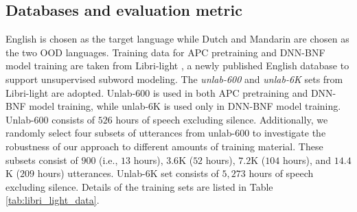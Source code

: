 \documentclass[a4paper]{article}
\begin{document}
\subsection{Databases and evaluation metric}
 English is chosen as the target language while Dutch and Mandarin are chosen as the two OOD languages. %
Training data for APC pretraining and DNN-BNF model training are taken from  Libri-light \cite{kahn2019librilight}, 
a newly published English database
to support unsupervised subword modeling. 
The \textit{unlab-600} and  \textit{unlab-6K} sets from Libri-light are adopted. Unlab-600 is used in both APC pretraining and DNN-BNF model training, while unlab-6K is used only in DNN-BNF model training.
Unlab-600   consists of 
$526$ hours of speech excluding silence.
Additionally, we randomly select four subsets of utterances from unlab-600 to investigate the robustness of our approach to different amounts of training material. These subsets consist of $900$ (i.e., $13$ hours), $3.6$K ($52$ hours), $7.2$K ($104$ hours), and $14.4$K ($209$ hours)   utterances. 
Unlab-6K  set consists of $5,273$ hours of
speech excluding silence.  Details of the training sets are listed in Table \ref{tab:libri_light_data}.
\begin{table}[!t]
\renewcommand\arraystretch{0.7}
\centering
\caption{Libri-light training data and its subsets.}
\label{tab:libri_light_data}
\end{table}
\end{document}
